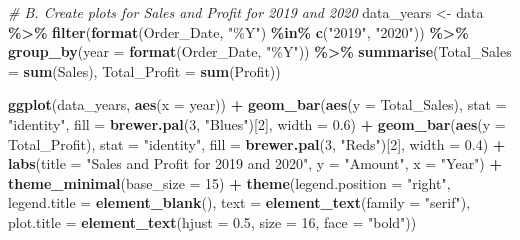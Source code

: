 \documentclass[
]{article}
\newenvironment{Shaded}{\begin{snugshade}}{\end{snugshade}}
\newcommand{\AttributeTok}[1]{\textcolor[rgb]{0.13,0.29,0.53}{#1}}
\newcommand{\CommentTok}[1]{\textcolor[rgb]{0.56,0.35,0.01}{\textit{#1}}}
\newcommand{\DecValTok}[1]{\textcolor[rgb]{0.00,0.00,0.81}{#1}}
\newcommand{\FloatTok}[1]{\textcolor[rgb]{0.00,0.00,0.81}{#1}}
\newcommand{\FunctionTok}[1]{\textcolor[rgb]{0.13,0.29,0.53}{\textbf{#1}}}
\newcommand{\NormalTok}[1]{#1}
\newcommand{\OtherTok}[1]{\textcolor[rgb]{0.56,0.35,0.01}{#1}}
\newcommand{\SpecialCharTok}[1]{\textcolor[rgb]{0.81,0.36,0.00}{\textbf{#1}}}
\newcommand{\StringTok}[1]{\textcolor[rgb]{0.31,0.60,0.02}{#1}}
\begin{document}
\begin{Shaded}
\begin{Highlighting}[]
\CommentTok{\# B. Create plots for Sales and Profit for 2019 and 2020}
\NormalTok{data\_years }\OtherTok{\textless{}{-}}\NormalTok{ data }\SpecialCharTok{\%\textgreater{}\%}
  \FunctionTok{filter}\NormalTok{(}\FunctionTok{format}\NormalTok{(Order\_Date, }\StringTok{"\%Y"}\NormalTok{) }\SpecialCharTok{\%in\%} \FunctionTok{c}\NormalTok{(}\StringTok{"2019"}\NormalTok{, }\StringTok{"2020"}\NormalTok{)) }\SpecialCharTok{\%\textgreater{}\%}
  \FunctionTok{group\_by}\NormalTok{(}\AttributeTok{year =} \FunctionTok{format}\NormalTok{(Order\_Date, }\StringTok{"\%Y"}\NormalTok{)) }\SpecialCharTok{\%\textgreater{}\%}
  \FunctionTok{summarise}\NormalTok{(}\AttributeTok{Total\_Sales =} \FunctionTok{sum}\NormalTok{(Sales), }\AttributeTok{Total\_Profit =} \FunctionTok{sum}\NormalTok{(Profit))}


\FunctionTok{ggplot}\NormalTok{(data\_years, }\FunctionTok{aes}\NormalTok{(}\AttributeTok{x =}\NormalTok{ year)) }\SpecialCharTok{+}
  \FunctionTok{geom\_bar}\NormalTok{(}\FunctionTok{aes}\NormalTok{(}\AttributeTok{y =}\NormalTok{ Total\_Sales), }\AttributeTok{stat =} \StringTok{"identity"}\NormalTok{, }\AttributeTok{fill =} \FunctionTok{brewer.pal}\NormalTok{(}\DecValTok{3}\NormalTok{, }\StringTok{"Blues"}\NormalTok{)[}\DecValTok{2}\NormalTok{], }\AttributeTok{width =} \FloatTok{0.6}\NormalTok{) }\SpecialCharTok{+}
  \FunctionTok{geom\_bar}\NormalTok{(}\FunctionTok{aes}\NormalTok{(}\AttributeTok{y =}\NormalTok{ Total\_Profit), }\AttributeTok{stat =} \StringTok{"identity"}\NormalTok{, }\AttributeTok{fill =} \FunctionTok{brewer.pal}\NormalTok{(}\DecValTok{3}\NormalTok{, }\StringTok{"Reds"}\NormalTok{)[}\DecValTok{2}\NormalTok{], }\AttributeTok{width =} \FloatTok{0.4}\NormalTok{) }\SpecialCharTok{+}
  \FunctionTok{labs}\NormalTok{(}\AttributeTok{title =} \StringTok{"Sales and Profit for 2019 and 2020"}\NormalTok{, }
       \AttributeTok{y =} \StringTok{"Amount"}\NormalTok{, }\AttributeTok{x =} \StringTok{"Year"}\NormalTok{) }\SpecialCharTok{+}
  \FunctionTok{theme\_minimal}\NormalTok{(}\AttributeTok{base\_size =} \DecValTok{15}\NormalTok{) }\SpecialCharTok{+} 
  \FunctionTok{theme}\NormalTok{(}\AttributeTok{legend.position =} \StringTok{"right"}\NormalTok{,}
        \AttributeTok{legend.title =} \FunctionTok{element\_blank}\NormalTok{(),}
        \AttributeTok{text =} \FunctionTok{element\_text}\NormalTok{(}\AttributeTok{family =} \StringTok{"serif"}\NormalTok{),}
        \AttributeTok{plot.title =} \FunctionTok{element\_text}\NormalTok{(}\AttributeTok{hjust =} \FloatTok{0.5}\NormalTok{, }\AttributeTok{size =} \DecValTok{16}\NormalTok{, }\AttributeTok{face =} \StringTok{"bold"}\NormalTok{))}
\end{Highlighting}
\end{Shaded}
\end{document}
